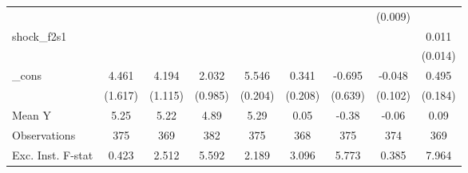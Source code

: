 {\begin{tabular}{l*{8}{c}}
            &                     &                     &                     &                     &                     &                     &     (0.009)         &                     \\
\addlinespace
shock\_f2s1  &                     &                     &                     &                     &                     &                     &                     &       0.011         \\
            &                     &                     &                     &                     &                     &                     &                     &     (0.014)         \\
\addlinespace
\_cons      &       4.461\sym{**} &       4.194\sym{***}&       2.032\sym{**} &       5.546\sym{***}&       0.341         &      -0.695         &      -0.048         &       0.495\sym{**} \\
            &     (1.617)         &     (1.115)         &     (0.985)         &     (0.204)         &     (0.208)         &     (0.639)         &     (0.102)         &     (0.184)         \\
\midrule
Mean Y      &        5.25         &        5.22         &        4.89         &        5.29         &        0.05         &       -0.38         &       -0.06         &        0.09         \\
Observations&         375         &         369         &         382         &         375         &         368         &         375         &         374         &         369         \\
Exc. Inst. F-stat&       0.423         &       2.512         &       5.592         &       2.189         &       3.096         &       5.773         &       0.385         &       7.964         \\
\bottomrule
\end{tabular}
}
